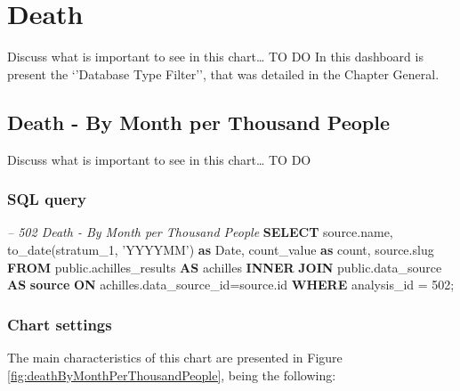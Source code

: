 \documentclass[]{book}
\newenvironment{Shaded}{\begin{snugshade}}{\end{snugshade}}
\newcommand{\KeywordTok}[1]{\textcolor[rgb]{0.13,0.29,0.53}{\textbf{#1}}}
\newcommand{\DataTypeTok}[1]{\textcolor[rgb]{0.13,0.29,0.53}{#1}}
\newcommand{\DecValTok}[1]{\textcolor[rgb]{0.00,0.00,0.81}{#1}}
\newcommand{\StringTok}[1]{\textcolor[rgb]{0.31,0.60,0.02}{#1}}
\newcommand{\CommentTok}[1]{\textcolor[rgb]{0.56,0.35,0.01}{\textit{#1}}}
\newcommand{\FunctionTok}[1]{\textcolor[rgb]{0.00,0.00,0.00}{#1}}
\newcommand{\NormalTok}[1]{#1}
\begin{document}
\chapter{Death}\label{death}

Discuss what is important to see in this chart\ldots{} TO DO In this
dashboard is present the `'Database Type Filter'', that was detailed in
the Chapter General.

\section{Death - By Month per Thousand
People}\label{death---by-month-per-thousand-people}

Discuss what is important to see in this chart\ldots{} TO DO

\subsection{SQL query}\label{sql-query-14}

\begin{Shaded}
\begin{Highlighting}[]
\CommentTok{-- 502  Death - By Month per Thousand People}
\KeywordTok{SELECT}\NormalTok{ source.name,}
       \FunctionTok{to_date}\NormalTok{(stratum_1, }\StringTok{'YYYYMM'}\NormalTok{) }\KeywordTok{as} \DataTypeTok{Date}\NormalTok{,}
\NormalTok{       count_value }\KeywordTok{as} \FunctionTok{count}\NormalTok{, }
\NormalTok{       source.slug}
\KeywordTok{FROM}\NormalTok{ public.achilles_results }\KeywordTok{AS}\NormalTok{ achilles }
    \KeywordTok{INNER} \KeywordTok{JOIN}\NormalTok{ public.data_source }\KeywordTok{AS} \KeywordTok{source} \KeywordTok{ON} 
\NormalTok{      achilles.data_source_id=source.id}
\KeywordTok{WHERE}\NormalTok{ analysis_id = }\DecValTok{502}\NormalTok{;}
\end{Highlighting}
\end{Shaded}

\subsection{Chart settings}\label{chart-settings-14}

The main characteristics of this chart are presented in Figure
\ref{fig:deathByMonthPerThousandPeople}, being the following:
\end{document}
